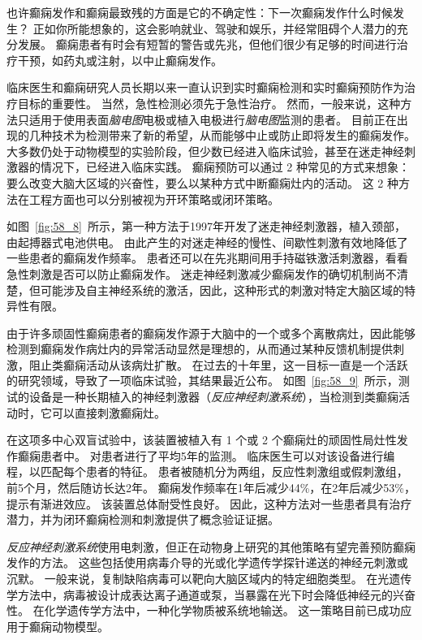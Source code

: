 \begin{proposition}[实时检测和预防癫痫的新方法] \label{box:58_2}
	
	\quad \quad 也许癫痫发作和癫痫最致残的方面是它的不确定性：下一次癫痫发作什么时候发生？
	正如你所能想象的，这会影响就业、驾驶和娱乐，并经常阻碍个人潜力的充分发展。
	癫痫患者有时会有短暂的警告或先兆，但他们很少有足够的时间进行治疗干预，如药丸或注射，以中止癫痫发作。
	
	\quad \quad 临床医生和癫痫研究人员长期以来一直认识到实时癫痫检测和实时癫痫预防作为治疗目标的重要性。
	当然，急性检测必须先于急性治疗。
	然而，一般来说，这种方法只适用于使用表面\textit{脑电图}电极或植入电极进行\textit{脑电图}监测的患者。
	目前正在出现的几种技术为检测带来了新的希望，从而能够中止或防止即将发生的癫痫发作。
	大多数仍处于动物模型的实验阶段，但少数已经进入临床试验，甚至在迷走神经刺激器的情况下，已经进入临床实践。
	癫痫预防可以通过 2 种常见的方式来想象：要么改变大脑大区域的兴奋性，要么以某种方式中断癫痫灶内的活动。
	这 2 种方法在工程方面也可以分别被视为开环策略或闭环策略。
	
	\quad \quad 如图~\ref{fig:58_8}~所示，第一种方法于1997年开发了迷走神经刺激器，植入颈部，由起搏器式电池供电。
	由此产生的对迷走神经的慢性、间歇性刺激有效地降低了一些患者的癫痫发作频率。
	患者还可以在先兆期间用手持磁铁激活刺激器，看看急性刺激是否可以防止癫痫发作。
	迷走神经刺激减少癫痫发作的确切机制尚不清楚，但可能涉及自主神经系统的激活，因此，这种形式的刺激对特定大脑区域的特异性有限。
	
	\quad \quad 由于许多顽固性癫痫患者的癫痫发作源于大脑中的一个或多个离散病灶，因此能够检测到癫痫发作病灶内的异常活动显然是理想的，从而通过某种反馈机制提供刺激，阻止类癫痫活动从该病灶扩散。
	在过去的十年里，这一目标一直是一个活跃的研究领域，导致了一项临床试验，其结果最近公布。
	如图~\ref{fig:58_9}~所示，测试的设备是一种长期植入的神经刺激器（\textit{反应神经刺激系统}），当检测到类癫痫活动时，它可以直接刺激癫痫灶。
	
	\quad \quad 在这项多中心双盲试验中，该装置被植入有 1 个或 2 个癫痫灶的顽固性局灶性发作癫痫患者中。
	对患者进行了平均5年的监测。
	临床医生可以对该设备进行编程，以匹配每个患者的特征。
	患者被随机分为两组，反应性刺激组或假刺激组，前5个月，然后随访长达2年。
	癫痫发作频率在1年后减少44\%，在2年后减少53\%，提示有渐进效应。
	该装置总体耐受性良好。
	因此，这种方法对一些患者具有治疗潜力，并为闭环癫痫检测和刺激提供了概念验证证据。
	
	\quad \quad \textit{反应神经刺激系统}使用电刺激，但正在动物身上研究的其他策略有望完善预防癫痫发作的方法。
	这些包括使用病毒介导的光或化学遗传学探针递送的神经元刺激或沉默。
	一般来说，复制缺陷病毒可以靶向大脑区域内的特定细胞类型。
	在光遗传学方法中，病毒被设计成表达离子通道或泵，当暴露在光下时会降低神经元的兴奋性。
	在化学遗传学方法中，一种化学物质被系统地输送。
	这一策略目前已成功应用于癫痫动物模型。
	

\end{proposition}
